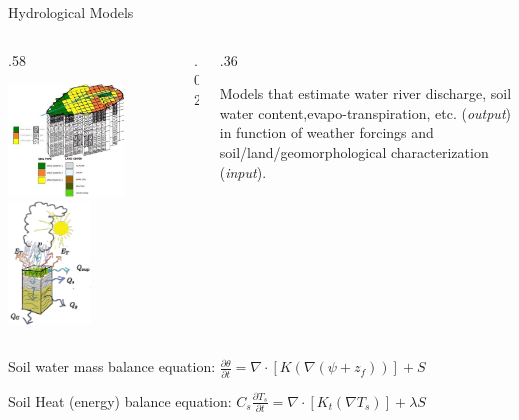 \documentclass[ignorenonframetext,]{beamer}
\def\begincols{\begin{columns}}
\def\begincol{\begin{column}}
\def\endcol{\end{column}}
\def\endcols{\end{columns}}
\begin{document}
\begin{frame}{Hydrological Models}

\begincols
 \begincol{.58\textwidth}

\includegraphics[width=0.70000\textwidth]{resources/images/geotop_grid_mod2.jpg}~
\includegraphics[width=0.50000\textwidth]{resources/images/water_balance.png}\\
\endcol
\begincol{.02\textwidth} \endcol
\begincol{.36\textwidth}

Models that estimate water river discharge, soil water
content,evapo-transpiration, etc. (\emph{output}) in function of weather
forcings and soil/land/geomorphological characterization (\emph{input}).

\endcol
\endcols
Soil water mass balance equation:
\(\frac{\partial \theta}{\partial t} = \nabla \cdot \left[ K \left(\nabla (\psi+z_f) \right) \right] +S\)

Soil Heat (energy) balance equation:
\(C_s \frac{\partial T_s}{\partial t} = \nabla \cdot \left[ K_t ( \nabla T_s ) \right] +\lambda S\)

\end{frame}
\end{document}
